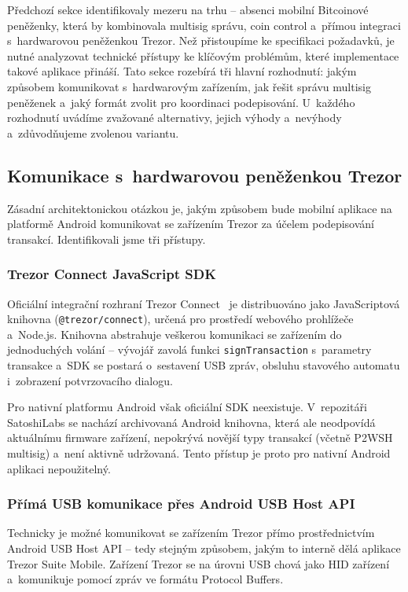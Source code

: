 Předchozí sekce identifikovaly mezeru na trhu -- absenci mobilní Bitcoinové
peněženky, která by kombinovala multisig správu, coin control a~přímou
integraci s~hardwarovou peněženkou Trezor. Než přistoupíme ke specifikaci
požadavků, je nutné analyzovat technické přístupy ke klíčovým problémům,
které implementace takové aplikace přináší. Tato sekce rozebírá tři
hlavní rozhodnutí: jakým způsobem komunikovat s~hardwarovým zařízením,
jak řešit správu multisig peněženek a~jaký formát zvolit pro koordinaci
podepisování. U~každého rozhodnutí uvádíme zvažované alternativy, jejich
výhody a~nevýhody a~zdůvodňujeme zvolenou variantu.


\subsection{Komunikace s~hardwarovou peněženkou Trezor}
\label{sec:analyza-trezor}

Zásadní architektonickou otázkou je, jakým způsobem bude mobilní aplikace
na platformě Android komunikovat se zařízením Trezor za účelem podepisování
transakcí. Identifikovali jsme tři přístupy.

\subsubsection{Trezor Connect JavaScript SDK}

Oficiální integrační rozhraní Trezor Connect~\citep{TrezorConnect} je
distribuováno jako JavaScriptová knihovna (\texttt{@trezor/connect}), určená
pro prostředí webového prohlížeče a~Node.js. Knihovna abstrahuje veškerou
komunikaci se zařízením do jednoduchých volání -- vývojář zavolá funkci
\texttt{signTransaction} s~parametry transakce a~SDK se postará o~sestavení
USB zpráv, obsluhu stavového automatu i~zobrazení potvrzovacího dialogu.

Pro nativní platformu Android však oficiální SDK neexistuje. V~repozitáři
SatoshiLabs se nachází archivovaná Android knihovna, která ale neodpovídá
aktuálnímu firmware zařízení, nepokrývá novější typy transakcí (včetně
P2WSH multisig) a~není aktivně udržovaná. Tento přístup je proto pro
nativní Android aplikaci nepoužitelný.

\subsubsection{Přímá USB komunikace přes Android USB Host API}

Technicky je možné komunikovat se zařízením Trezor přímo prostřednictvím
Android USB Host API -- tedy stejným způsobem, jakým to interně dělá
aplikace Trezor Suite Mobile. Zařízení Trezor se na úrovni USB chová
jako HID zařízení a~komunikuje pomocí zpráv ve formátu Protocol Buffers.

